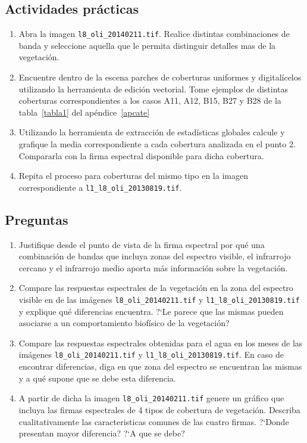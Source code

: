 \documentclass[hidelinks,12pt]{article}
\begin{document}
\subsection{Actividades pr\'acticas}
\begin{enumerate}
    \item Abra la imagen \texttt{l8\_oli\_20140211.tif}. Realice distintas
        combinaciones de banda y seleccione aquella que le permita distinguir 
        detalles mas de la vegetación.
    \item Encuentre dentro de la escena parches de coberturas uniformes y 
        digitalícelos utilizando la herramienta de edición vectorial. Tome
        ejemplos de distintas coberturas correspondientes a los casos A11, A12,
        B15, B27 y B28 de la tabla~\ref{tabla1} del ap\'endice~\ref{apcate}
    \item Utilizando la herramienta de extracción de estadísticas globales
        calcule y grafique la media correspondiente a cada cobertura analizada 
        en el punto 2. Compararla con la firma espectral disponible para dicha
        cobertura.
    \item Repita el proceso para coberturas del mismo tipo en la imagen 
        correspondiente a \texttt{l1\_l8\_oli\_20130819.tif}.
\end{enumerate}
\subsection{Preguntas}
\begin{enumerate}
    \item Justifique desde el punto de vista de la firma espectral por qué una
        combinación de bandas que incluya zonas del espectro visible, el
        infrarrojo cercano y el infrarrojo medio aporta más información sobre la
        vegetación.
    \item Compare las respuestas espectrales de la vegetación en la zona del
        espectro visible en de las im\'agenes \texttt{l8\_oli\_20140211.tif}
        y \texttt{l1\_l8\_oli\_20130819.tif} y explique qué diferencias
        encuentra. ?`Le parece que las mismas pueden asociarse a un
        comportamiento biof\'isico de la vegetaci\'on?
    \item Compare las respuestas espectrales obtenidas para el agua en los meses
        de las im\'agenes \texttt{l8\_oli\_20140211.tif}
        y \texttt{l1\_l8\_oli\_20130819.tif}. En caso de encontrar diferencias, 
        diga en que zona del espectro se encuentran las mismas y a qué supone que 
        se debe esta diferencia.
    \item A partir de dicha la imagen \texttt{l8\_oli\_20140211.tif} genere un 
        gráfico que incluya las firmas espectrales de 4 tipos de cobertura de 
        vegetación. Describa cualitativamente las caracteristicas comunes de las
        cuatro firmas. ?`Donde presentan mayor diferencia? ?`A que se debe?
\end{enumerate}
\end{document}

